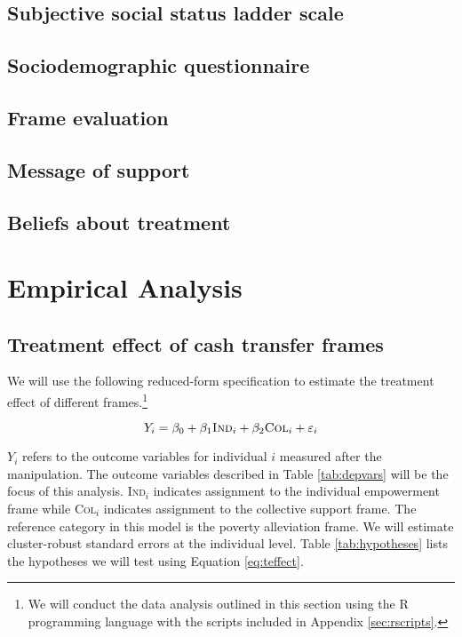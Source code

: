 \documentclass[11pt, a4paper]{article}\usepackage[]{graphicx}\usepackage[]{color}
\begin{document}
    \subsection{Subjective social status ladder scale}
    \subsection{Sociodemographic questionnaire}
    \subsection{Frame evaluation}
    \subsection{Message of support}
    \subsection{Beliefs about treatment}

\section{Empirical Analysis}

    \subsection{Treatment effect of cash transfer frames}


        We will use the following reduced-form specification to estimate the treatment effect of different frames.\footnote{We will conduct the data analysis outlined in this section using the R programming language with the scripts included in Appendix \ref{sec:rscripts}.}

  		\begin{equation} \label{eq:teffect}
            Y_{i} = \beta_{0} + \beta_{1}\text{\textsc{Ind}}_{i} + \beta_{2}\text{\textsc{Col}}_{i} + \varepsilon_{i}
		\end{equation}

        $Y_{i}$ refers to the outcome variables for individual $i$ measured after the manipulation. The outcome variables described in Table \ref{tab:depvars} will be the focus of this analysis. \textsc{Ind}$_{i}$ indicates assignment to the individual empowerment frame while \textsc{Col}$_{i}$ indicates assignment to the collective support frame. The reference category in this model is the poverty alleviation frame. We will estimate cluster-robust standard errors at the individual level. Table \ref{tab:hypotheses} lists the hypotheses we will test using Equation \ref{eq:teffect}.
\end{document}
